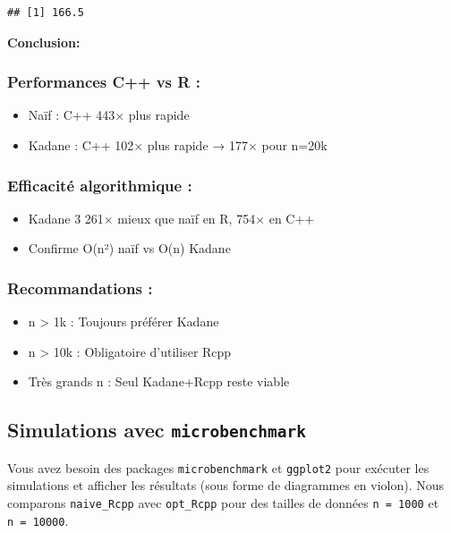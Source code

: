 \documentclass[
]{article}
\begin{document}
\begin{verbatim}
## [1] 166.5
\end{verbatim}

\textbf{Conclusion:}

\subsubsection{Performances C++ vs R :}\label{performances-c-vs-r}

\begin{itemize}
\item
  Naïf : C++ 443× plus rapide
\item
  Kadane : C++ 102× plus rapide → 177× pour n=20k
\end{itemize}

\subsubsection{Efficacité algorithmique
:}\label{efficacituxe9-algorithmique}

\begin{itemize}
\item
  Kadane 3 261× mieux que naïf en R, 754× en C++
\item
  Confirme O(n²) naïf vs O(n) Kadane
\end{itemize}

\subsubsection{Recommandations :}\label{recommandations}

\begin{itemize}
\item
  n \textgreater{} 1k : Toujours préférer Kadane
\item
  n \textgreater{} 10k : Obligatoire d'utiliser Rcpp
\item
  Très grands n : Seul Kadane+Rcpp reste viable
\end{itemize}

\subsection{\texorpdfstring{Simulations avec
\texttt{microbenchmark}}{Simulations avec microbenchmark}}\label{simulations-avec-microbenchmark}

Vous avez besoin des packages \texttt{microbenchmark} et
\texttt{ggplot2} pour exécuter les simulations et afficher les résultats
(sous forme de diagrammes en violon). Nous comparons
\texttt{naive\_Rcpp} avec \texttt{opt\_Rcpp} pour des tailles de données
\texttt{n\ =\ 1000} et \texttt{n\ =\ 10000}.
\end{document}
